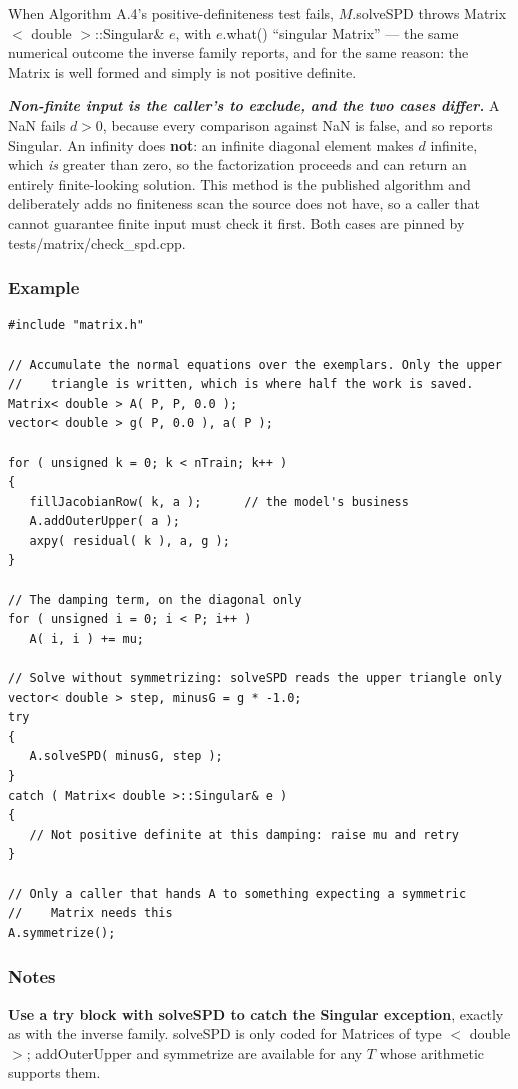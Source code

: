 \documentclass{report}
\begin{document}
When Algorithm A.4's positive-definiteness test fails, $M$.solveSPD throws
Matrix$<$ double $>$::Singular\& $e$, with $e$.what() ``singular Matrix'' ---
the same numerical outcome the inverse family reports, and for the same reason:
the Matrix is well formed and simply is not positive definite.

{\em \bf Non-finite input is the caller's to exclude, and the two cases differ.}
A NaN fails $d > 0$, because every comparison against NaN is false, and so
reports Singular.  An infinity does {\bf not}: an infinite diagonal element makes
$d$ infinite, which {\em is} greater than zero, so the factorization proceeds and
can return an entirely finite-looking solution.  This method is the published
algorithm and deliberately adds no finiteness scan the source does not have, so a
caller that cannot guarantee finite input must check it first.  Both cases are
pinned by tests/matrix/check\_spd.cpp.

\subsubsection{Example}
\begin{verbatim}
#include "matrix.h"

// Accumulate the normal equations over the exemplars. Only the upper
//    triangle is written, which is where half the work is saved.
Matrix< double > A( P, P, 0.0 );
vector< double > g( P, 0.0 ), a( P );

for ( unsigned k = 0; k < nTrain; k++ )
{
   fillJacobianRow( k, a );      // the model's business
   A.addOuterUpper( a );
   axpy( residual( k ), a, g );
}

// The damping term, on the diagonal only
for ( unsigned i = 0; i < P; i++ )
   A( i, i ) += mu;

// Solve without symmetrizing: solveSPD reads the upper triangle only
vector< double > step, minusG = g * -1.0;
try
{
   A.solveSPD( minusG, step );
}
catch ( Matrix< double >::Singular& e )
{
   // Not positive definite at this damping: raise mu and retry
}

// Only a caller that hands A to something expecting a symmetric
//    Matrix needs this
A.symmetrize();
\end{verbatim}

\subsubsection{Notes}

{\bf Use a try block with solveSPD to catch the Singular exception}, exactly as
with the inverse family.  solveSPD is only coded for Matrices of type $<$ double
$>$; addOuterUpper and symmetrize are available for any $T$ whose arithmetic
supports them.
\end{document}
